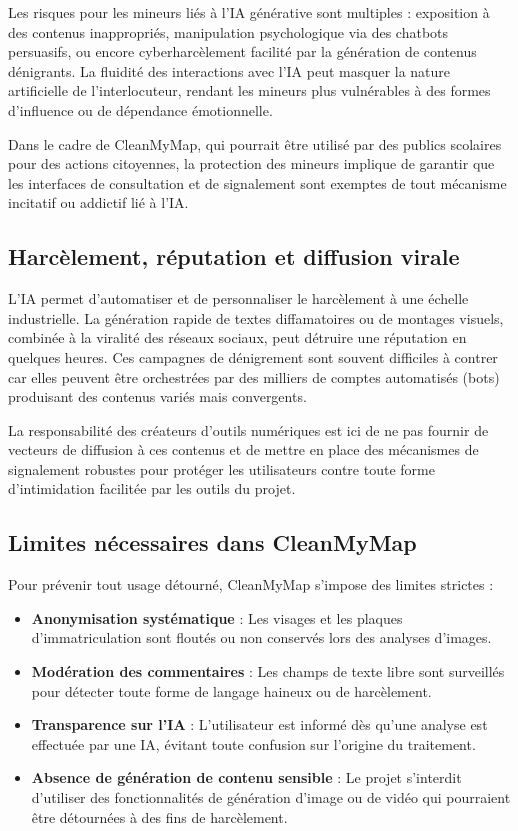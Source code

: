 \documentclass[
  10pt,
  a4paper,
  DIV=11,
  numbers=noendperiod,
  oneside]{scrreprt}
\providecommand{\tightlist}{%
  \setlength{\itemsep}{0pt}\setlength{\parskip}{0pt}}
\let\oldtextbf\textbf
\renewcommand{\textbf}[1]{\oldtextbf{\textcolor{cmmnavy}{#1}}}
\begin{document}
Les risques pour les mineurs liés à l'IA générative sont multiples :
exposition à des contenus inappropriés, manipulation psychologique via
des chatbots persuasifs, ou encore cyberharcèlement facilité par la
génération de contenus dénigrants. La fluidité des interactions avec
l'IA peut masquer la nature artificielle de l'interlocuteur, rendant les
mineurs plus vulnérables à des formes d'influence ou de dépendance
émotionnelle.

Dans le cadre de CleanMyMap, qui pourrait être utilisé par des publics
scolaires pour des actions citoyennes, la protection des mineurs
implique de garantir que les interfaces de consultation et de
signalement sont exemptes de tout mécanisme incitatif ou addictif lié à
l'IA.

\subsection{Harcèlement, réputation et diffusion
virale}\label{harcuxe8lement-ruxe9putation-et-diffusion-virale}

L'IA permet d'automatiser et de personnaliser le harcèlement à une
échelle industrielle. La génération rapide de textes diffamatoires ou de
montages visuels, combinée à la viralité des réseaux sociaux, peut
détruire une réputation en quelques heures. Ces campagnes de dénigrement
sont souvent difficiles à contrer car elles peuvent être orchestrées par
des milliers de comptes automatisés (bots) produisant des contenus
variés mais convergents.

La responsabilité des créateurs d'outils numériques est ici de ne pas
fournir de vecteurs de diffusion à ces contenus et de mettre en place
des mécanismes de signalement robustes pour protéger les utilisateurs
contre toute forme d'intimidation facilitée par les outils du projet.

\subsection{Limites nécessaires dans
CleanMyMap}\label{limites-nuxe9cessaires-dans-cleanmymap}

Pour prévenir tout usage détourné, CleanMyMap s'impose des limites
strictes :

\begin{itemize}
\tightlist
\item
  \textbf{Anonymisation systématique} : Les visages et les plaques
  d'immatriculation sont floutés ou non conservés lors des analyses
  d'images.
\item
  \textbf{Modération des commentaires} : Les champs de texte libre sont
  surveillés pour détecter toute forme de langage haineux ou de
  harcèlement.
\item
  \textbf{Transparence sur l'IA} : L'utilisateur est informé dès qu'une
  analyse est effectuée par une IA, évitant toute confusion sur
  l'origine du traitement.
\item
  \textbf{Absence de génération de contenu sensible} : Le projet
  s'interdit d'utiliser des fonctionnalités de génération d'image ou de
  vidéo qui pourraient être détournées à des fins de harcèlement.
\end{itemize}
\end{document}
